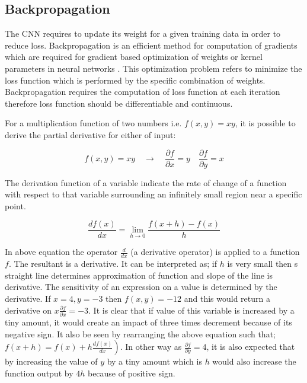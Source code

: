 \documentclass[11pt]{article}
\begin{document}
\subsection{Backpropagation}
The CNN requires to update its weight for a given training data in order to reduce loss. Backpropagation is an efficient method for computation of gradients which are required for gradient based optimization of weights or kernel parameters in neural networks \cite{rumelhart1988learning}. This optimization problem refers to minimize the loss function which is performed by the specific combination of weights. Backpropagation requires the computation of loss function at each iteration therefore loss function should be differentiable and continuous.

For a multiplication function of two numbers i.e. $f(x, y)=x y$, it is possible to derive the partial derivative for either of input:

\begin{equation}
f(x, y)=x y \quad \rightarrow \quad \frac{\partial f}{\partial x}=y \quad \frac{\partial f}{\partial y}=x
\end{equation}

The derivation function of a variable indicate the rate of change of a function with respect to that variable surrounding an infinitely small region near a specific point.

\begin{equation}
\frac{d f(x)}{d x}=\lim _{h \rightarrow 0} \frac{f(x+h)-f(x)}{h}
\end{equation}

In above equation the operator $ \frac{d}{d x} $ (a derivative operator) is applied to a function $f$. The resultant is a derivative. It can be interpreted as; if $h$ is very small then s straight line determines approximation of function and slope of the line is derivative. The sensitivity of an expression on a value is determined by the derivative. If $x=4, y=-3$ then $f(x, y)=-12$ and this would return a derivative on $x \frac{\partial f}{\partial x}=-3$. It is clear that if value of this variable is increased by a tiny amount, it would create an impact of three times decrement because of its negative sign. It also be seen by rearranging the above equation such that; $\left.f(x+h)=f(x)+h \frac{d f(x)}{d x}\right)$. In other way as $\frac{\partial f}{\partial y}=4$, it is also expected that by increasing the value of $y$ by a tiny amount which is $h$ would also increase the function output by $4h$ because of positive sign.
\end{document}
